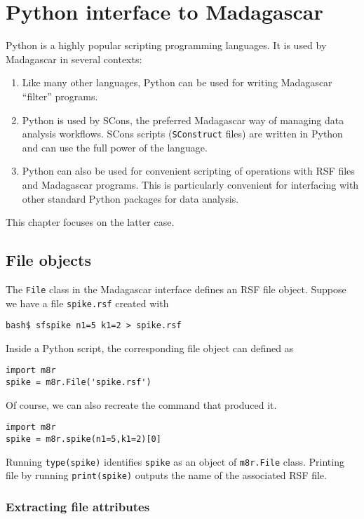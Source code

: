 \chapter{Python interface to Madagascar}

Python is a highly popular scripting programming languages. It is used by Madagascar in several contexts:
\begin{enumerate}
\item Like many other languages, Python can be used for writing Madagascar ``filter'' programs.
\item Python is used by SCons, the preferred Madagascar way of
  managing data analysis workflows. SCons scripts (\texttt{SConstruct}
  files) are written in Python and can use the full power of the
  language.
\item Python can also be used for convenient scripting of operations
  with RSF files and Madagascar programs. This is particularly
  convenient for interfacing with other standard Python packages for
  data analysis.
\end{enumerate}
This chapter focuses on the latter case.

\section{File objects}
\lstset{language=python,showstringspaces=false}

The \texttt{File} class in the Madagascar interface defines an RSF file object. Suppose we have a file \texttt{spike.rsf} created with
\begin{verbatim}
bash$ sfspike n1=5 k1=2 > spike.rsf
\end{verbatim}
Inside a Python script, the corresponding file object can defined as
\begin{lstlisting}
import m8r
spike = m8r.File('spike.rsf')  
\end{lstlisting}
Of course, we can also recreate the command that produced it.
\begin{lstlisting}
import m8r
spike = m8r.spike(n1=5,k1=2)[0]
\end{lstlisting}
Running \texttt{type(spike)} identifies \texttt{spike} as an object of
\texttt{m8r.File} class. Printing file by running
\texttt{print(spike)} outputs the name of the associated RSF file.

\subsection{Extracting file attributes}

